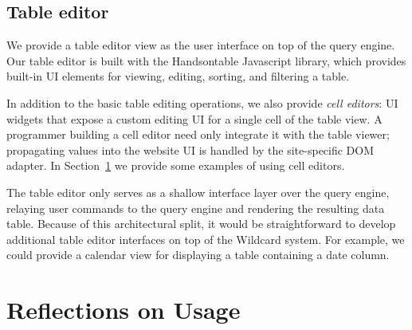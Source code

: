 \documentclass[sigplan,screen,10pt,anonymous,review]{acmart}
\begin{document}
\hypertarget{table-editor}{%
\subsection{Table editor}\label{table-editor}}

We provide a table editor view as the user interface on top of the query
engine. Our table editor is built with the Handsontable Javascript
library, which provides built-in UI elements for viewing, editing,
sorting, and filtering a table.

In addition to the basic table editing operations, we also provide
\emph{cell editors}: UI widgets that expose a custom editing UI for a
single cell of the table view. A programmer building a cell editor need
only integrate it with the table viewer; propagating values into the
website UI is handled by the site-specific DOM adapter. In
Section~\ref{sec:reflections} we provide some examples of using cell
editors.

The table editor only serves as a shallow interface layer over the query
engine, relaying user commands to the query engine and rendering the
resulting data table. Because of this architectural split, it would be
straightforward to develop additional table editor interfaces on top of
the Wildcard system. For example, we could provide a calendar view for
displaying a table containing a date column.

\hypertarget{sec:reflections}{%
\section{Reflections on Usage}\label{sec:reflections}}
\end{document}
